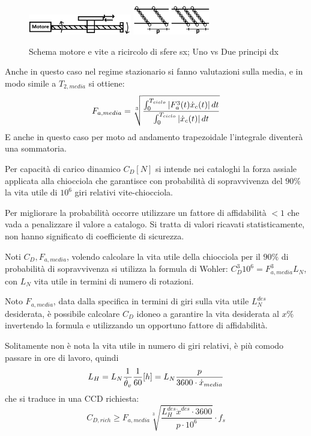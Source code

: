 \begin{figure}[h]
    \centering
    \includegraphics[width=0.4\textwidth]{Immagini/mot_vite_ricircolo.png}
    \includegraphics[width=0.3\textwidth]{Immagini/principi_viti_ricircolo.png}
    \caption{Schema motore e vite a ricircolo di sfere sx; Uno vs Due principi dx}
\end{figure}

Anche in questo caso nel regime stazionario si fanno valutazioni sulla media, e in modo simile a \( T_{2,media} \) si ottiene:
\[ F_{a, media} = \sqrt[3]{\frac{\int^{T_{ciclo}}_0 \left|F_a^3(t)\dot{x}_c(t)\right|dt}{\int^{T_{ciclo}}_0 \left|\dot{x}_c(t)\right|dt}} \]
E anche in questo caso per moto ad andamento trapezoidale l'integrale diventerà una sommatoria.

Per capacità di carico dinamico \( C_D [N] \) si intende nei cataloghi la forza assiale applicata alla  chiocciola che garantisce con probabilità di sopravvivenza del \(90\%\) la vita utile di \(10^6\) giri relativi vite-chiocciola.

Per migliorare la probabilità occorre utilizzare un fattore di affidabilità \(<1\) che vada a penalizzare il valore a catalogo. Si tratta di valori ricavati statisticamente, non hanno significato di coefficiente di sicurezza.

Noti \(C_D, F_{a, media}\), volendo calcolare la vita utile della chiocciola per il \(90\%\) di probabilità di sopravvivenza si utilizza la formula di Wohler: \( C_D^3 10^6 = F_{a,media}^3 L_N \), con \(L_N\) vita utile in termini di numero di rotazioni.

Noto \(F_{a,media}\), data dalla specifica in termini di giri sulla vita utile \(L_N^{des}\) desiderata, è possibile calcolare \(C_D\) idoneo a garantire la vita desiderata al \(x\%\) invertendo la formula e utilizzando un opportuno fattore di affidabilità.

Solitamente non è nota la vita utile in numero di giri relativi, è più comodo passare in ore di lavoro, quindi 
\[ L_H = L_N \frac{1}{\dot{\theta}_v} \frac{1}{60} [h] = L_N \frac{p}{3600 \cdot \dot{x}_{media}} \]
che si traduce in una CCD richiesta: 
\[ C_{D,rich} \geqslant F_{a,media} \sqrt[3]{\frac{L_H^{des}\dot{x}^{des} \cdot 3600}{p \cdot 10^6}} \cdot f_s \]

